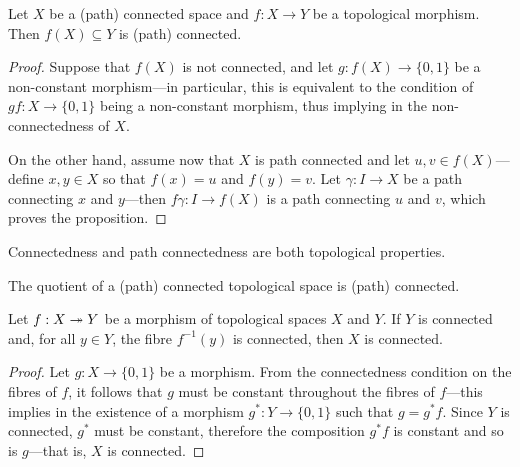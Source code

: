\begin{theorem}
    \label{thm:morphisms-preserve-connectivity}
    Let \(X\) be a (path) connected space and \(f: X \to Y\) be a topological
    morphism. Then \(f(X) \subseteq Y\) is (path) connected.
\end{theorem}

\begin{proof}
    Suppose that \(f(X)\) is not connected, and let \(g: f(X) \to \{0, 1\}\) be a
    non-constant morphism---in particular, this is equivalent to the condition of
    \(gf: X \to \{0, 1\}\) being a non-constant morphism, thus implying in the
    non-connectedness of \(X\).

    On the other hand, assume now that \(X\) is path connected and let
    \(u, v \in f(X)\)---define \(x, y \in X\) so that \(f(x) = u\) and \(f(y) = v\). Let
    \(\gamma: I \to X\) be a path connecting \(x\) and \(y\)---then
    \(f\gamma: I \to f(X)\) is a path connecting \(u\) and \(v\), which proves the
    proposition.
\end{proof}

\begin{corollary}
    \label{cor:connectedness-top-property}
    Connectedness and path connectedness are both topological properties.
\end{corollary}

\begin{corollary}
    \label{cor:quotient-path-connected-is-path-connected}
    The quotient of a (path) connected topological space is (path) connected.
\end{corollary}

\begin{proposition}
    \label{prop:connectivity-quotients}
    Let \(f: X \twoheadrightarrow Y\) be a morphism of topological spaces \(X\) and \(Y\). If
    \(Y\) is connected and, for all \(y \in Y\), the fibre \(f^{-1}(y)\) is
    connected, then \(X\) is connected.
\end{proposition}

\begin{proof}
    Let \(g: X \to \{0, 1\}\) be a morphism. From the connectedness condition on the
    fibres of \(f\), it follows that \(g\) must be constant throughout the fibres of
    \(f\)---this implies in the existence of a morphism \(g^{*}: Y \to \{0, 1\}\)
    such that \(g = g^{*} f\). Since \(Y\) is connected, \(g^{*}\) must be constant,
    therefore the composition \(g^{*} f\) is constant and so is \(g\)---that is,
    \(X\) is connected.
\end{proof}

